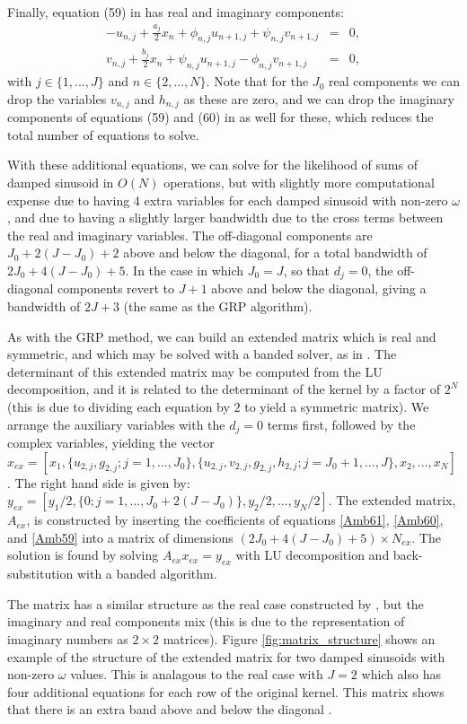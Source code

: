 \documentclass[manuscript, letterpaper]{aastex6}
\begin{document}
Finally, equation (59) in \citet{Ambikasaran:2015} has real and imaginary components:
\begin{eqnarray} \label{Amb59}
-u_{n,j} + \frac{a_j}{2} x_n + \phi_{n,j} u_{n+1,j} + \psi_{n,j} v_{n+1,j} &=&0,\\
 v_{n,j} + \frac{b_j}{2} x_n + \psi_{n,j} u_{n+1,j} - \phi_{n,j} v_{n+1,j} &=&0,
\end{eqnarray}
with $j \in \{1,...,J\}$ and $n \in \{2,...,N\}$.  Note that for the $J_0$ real components
we can drop the variables $v_{n,j}$ and $h_{n,j}$ as these are zero, and we can drop the
imaginary components of equations (59) and (60) in \citet{Ambikasaran:2015} as well for these, which reduces the total number
of equations to solve.

With these additional equations, we can solve for the likelihood of sums of damped sinusoid
in $O(N)$ operations, but with slightly more computational expense due to having 4 extra variables
for each damped sinusoid with non-zero $\omega$, and due to having a slightly larger bandwidth due to the
cross terms between the real and imaginary variables.  The off-diagonal components are $J_0+2(J-J_0)+2$ above
and below the diagonal, for a total bandwidth of $2J_0+4(J-J_0)+5$. In the case in which $J_0=J$, so
that $d_j=0$, the off-diagonal components revert to $J+1$
above and below the diagonal, giving a bandwidth of $2J+3$ (the same as the GRP algorithm).

As with the GRP method, we can build an extended matrix which is real and symmetric, and which may be
solved with a banded solver, as in \citet{NumericalRecipes}.  The determinant of this extended matrix
may be computed from the LU decomposition, and it is related to the determinant of the kernel by a
factor of $2^N$ (this is due to dividing each equation by $2$ to yield a symmetric matrix).
We arrange the auxiliary variables with the $d_j=0$
terms first, followed by the complex variables, yielding the vector
$x_{ex} = [x_1, \{u_{2,j},g_{2,j};j=1,...,J_0\}, \{u_{2,j},v_{2,j},g_{2,j},h_{2,j};j=J_0+1,...,J\},
x_2, ..., x_N]$.  The right hand side is given by: $y_{ex} = [y_1/2, \{0; j=1,...,J_0+2(J-J_0)\}, y_2/2, ..., y_N/2]$.
The extended matrix, $A_{ex}$, is constructed by inserting the coefficients of equations \ref{Amb61},
\ref{Amb60}, and \ref{Amb59} into a matrix of dimensions $(2J_0+4(J-J_0)+5) \times N_{ex}$.
The solution is found by solving $A_{ex} x_{ex} = y_{ex}$ with LU decomposition and back-substitution
with a banded algorithm.

The matrix has a similar structure as the real case constructed by \citep{Ambikasaran:2015}, but the
imaginary and real components mix (this is due to the representation of imaginary numbers as
$2\times 2$ matrices).  Figure \ref{fig:matrix_structure} shows an example of the structure of the extended
matrix for two damped sinusoids with non-zero $\omega$ values.  This is analagous to the real case with
$J=2$ which also has four additional equations for each row of the original kernel.  This matrix shows
that there is an extra band above and below the diagonal \citep[compare with Figure 2 of][]{Ambikasaran:2015}.
\end{document}
